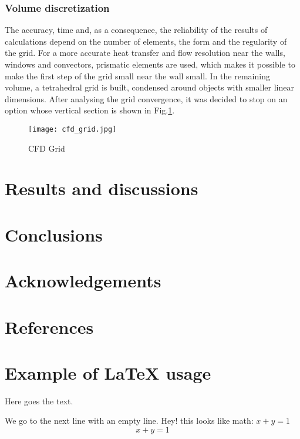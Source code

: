 \documentclass[preprint,12pt]{elsarticle}
\begin{document}
\subsubsection{Volume discretization}
The accuracy, time and, as a consequence, the reliability of the results of calculations depend on the number of elements, the form and the regularity of the grid. For a more accurate heat transfer and flow resolution near the walls, windows and convectors, prismatic elements are used, which makes it possible to make the first step of the grid small near the wall small. In the remaining volume, a tetrahedral grid is built, condensed around objects with smaller linear dimensions. After analysing the grid convergence, it was decided to stop on an option whose vertical section is shown in Fig.\ref{fig:cfd_grid}.


\begin{figure}
\centering

\texttt{[image: cfd\_grid.jpg]}
\caption{CFD Grid}\label{fig:cfd_grid}

\end{figure}



\section{Results and discussions}


\section{Conclusions}

\section*{Acknowledgements}

\section*{References}

\section*{Example of LaTeX usage}

Here goes the text.

We go to the next line with an empty line.
Hey! this looks like math: $x+y=1$
$$x+y=1$$
\end{document}
